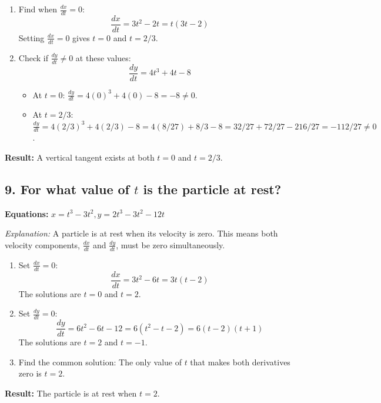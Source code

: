 \documentclass[12pt]{article}
\newcommand{\questiontitle}[1]{\subsection*{#1}}
\begin{document}
\begin{enumerate}
    \item Find when $\frac{dx}{dt} = 0$:
    $$ \frac{dx}{dt} = 3t^2 - 2t = t(3t-2) $$
    Setting $\frac{dx}{dt}=0$ gives $t=0$ and $t=2/3$.
    
    \item Check if $\frac{dy}{dt} \ne 0$ at these values:
    $$ \frac{dy}{dt} = 4t^3+4t-8 $$
    \begin{itemize}
        \item At $t=0$: $\frac{dy}{dt} = 4(0)^3+4(0)-8 = -8 \ne 0$.
        \item At $t=2/3$: $\frac{dy}{dt} = 4(2/3)^3+4(2/3)-8 = 4(8/27)+8/3-8 = 32/27+72/27-216/27 = -112/27 \ne 0$.
    \end{itemize}
\end{enumerate}
\textbf{Result:} A vertical tangent exists at both $t=0$ and $t=2/3$.

\questiontitle{9. For what value of $t$ is the particle at rest?}

\textbf{Equations:} $x=t^3-3t^2, y=2t^3-3t^2-12t$

\textit{Explanation:} A particle is at rest when its velocity is zero. This means both velocity components, $\frac{dx}{dt}$ and $\frac{dy}{dt}$, must be zero simultaneously.

\begin{enumerate}
    \item Set $\frac{dx}{dt} = 0$:
    $$ \frac{dx}{dt} = 3t^2 - 6t = 3t(t-2) $$
    The solutions are $t=0$ and $t=2$.
    
    \item Set $\frac{dy}{dt} = 0$:
    $$ \frac{dy}{dt} = 6t^2 - 6t - 12 = 6(t^2 - t - 2) = 6(t-2)(t+1) $$
    The solutions are $t=2$ and $t=-1$.
    
    \item Find the common solution: The only value of $t$ that makes both derivatives zero is $t=2$.
\end{enumerate}
\textbf{Result:} The particle is at rest when $t=2$.
\end{document}
